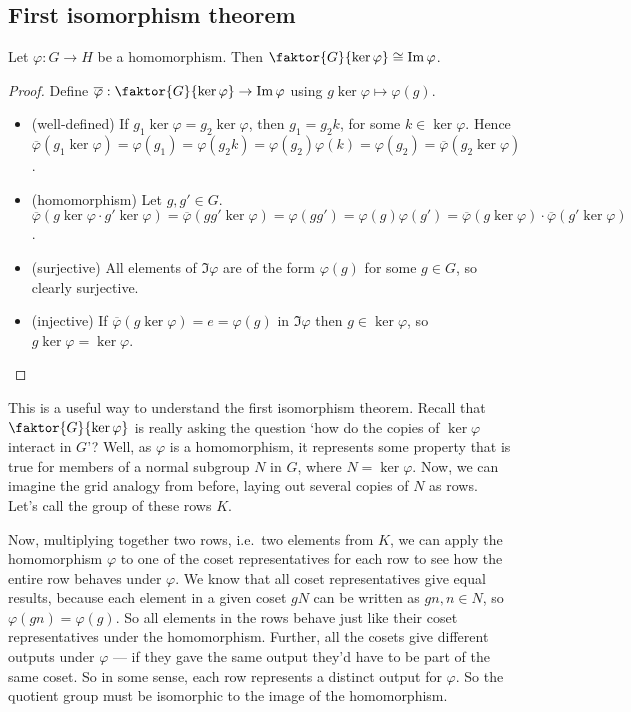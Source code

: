 \subsection{First isomorphism theorem}
\begin{theorem}
	Let \(\varphi: G \to H\) be a homomorphism.
	Then \(\faktor{G}{\ker \varphi} \cong \Im \varphi\).
\end{theorem}
\begin{proof}
	Define \(\overline \varphi: \faktor{G}{\ker \varphi} \to \Im \varphi\) using \(g \ker \varphi \mapsto \varphi(g)\).
	\begin{itemize}
		\item (well-defined) If \(g_1 \ker \varphi = g_2 \ker \varphi\), then \(g_1 = g_2k\), for some \(k \in \ker \varphi\).
		      Hence \(\overline\varphi(g_1 \ker \varphi) = \varphi(g_1) = \varphi(g_2k) = \varphi(g_2)\varphi(k) = \varphi(g_2) = \overline\varphi(g_2 \ker \varphi)\).
		\item (homomorphism) Let \(g, g' \in G\).
		      \(\overline\varphi(g \ker \varphi \cdot g' \ker \varphi) = \overline\varphi(gg' \ker \varphi) = \varphi(gg') = \varphi(g)\varphi(g') = \overline\varphi(g\ker\varphi) \cdot \overline\varphi(g'\ker\varphi)\).
		\item (surjective) All elements of \(\Im \varphi\) are of the form \(\varphi(g)\) for some \(g \in G\), so clearly surjective.
		\item (injective) If \(\overline\varphi(g \ker \varphi) = e = \varphi(g)\) in \(\Im \varphi\) then \(g \in \ker \varphi\), so \(g \ker \varphi = \ker \varphi\).
	\end{itemize}
\end{proof}
This is a useful way to understand the first isomorphism theorem.
Recall that \(\faktor{G}{\ker \varphi}\) is really asking the question `how do the copies of \(\ker \varphi\) interact in \(G\)'?
Well, as \(\varphi\) is a homomorphism, it represents some property that is true for members of a normal subgroup \(N\) in \(G\), where \(N = \ker \varphi\).
Now, we can imagine the grid analogy from before, laying out several copies of \(N\) as rows.
Let's call the group of these rows \(K\).

Now, multiplying together two rows, i.e.\ two elements from \(K\), we can apply the homomorphism \(\varphi\) to one of the coset representatives for each row to see how the entire row behaves under \(\varphi\).
We know that all coset representatives give equal results, because each element in a given coset \(gN\) can be written as \(gn, n \in N\), so \(\varphi(gn) = \varphi(g)\).
So all elements in the rows behave just like their coset representatives under the homomorphism.
Further, all the cosets give different outputs under \(\varphi\) --- if they gave the same output they'd have to be part of the same coset.
So in some sense, each row represents a distinct output for \(\varphi\).
So the quotient group must be isomorphic to the image of the homomorphism.

